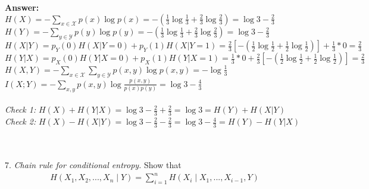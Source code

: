 \documentclass[12pt]{article}
\begin{document}
	\textbf{Answer:} \\
	$H(X) = -\sum_{x\in\mathcal{X}}p(x)\log p(x) = -(\frac{1}{3}\log\frac{1}{3} + \frac{2}{3}\log\frac{2}{3}) = \log3-\frac{2}{3}$\\
	$H(Y) = -\sum_{y\in\mathcal{Y}}p(y)\log p(y) = -(\frac{1}{3}\log\frac{1}{3} + \frac{2}{3}\log\frac{2}{3}) = \log3-\frac{2}{3}$ \\
	$H(X|Y) = p_Y(0)H(X|Y=0)+p_Y(1)H(X|Y=1) = \frac{2}{3}[-(\frac{1}{2}\log\frac{1}{2} + \frac{1}{2}\log\frac{1}{2})] + \frac{1}{3}*0 = \frac{2}{3}$ \\
	$H(Y|X) = p_X(0)H(Y|X=0)+p_X(1)H(Y|X=1) = \frac{1}{3}*0 + \frac{2}{3}[-(\frac{1}{2}\log\frac{1}{2} + \frac{1}{2}\log\frac{1}{2})] = \frac{2}{3}$ \\
	$H(X,Y) = -\sum_{x\in\mathcal{X}}\sum_{y\in\mathcal{Y}}p(x,y)\log p(x,y) = -\log\frac{1}{3}$ \\
	$I(X;Y) = -\sum_{x,y}p(x,y)\log\frac{p(x,y)}{p(x)p(y)} = \log3-\frac{4}{3}$ \\
	\\
	\textit{Check 1:} $H(X)+H(Y|X) = \log3 - \frac{2}{3} + \frac{2}{3} = \log3 = H(Y) + H(X|Y)$ \\
	\textit{Check 2:} $H(X)-H(X|Y) = \log3-\frac{2}{3} - \frac{2}{3} = \log3-\frac{4}{3} = H(Y) - H(Y|X)$ \\
	\\
	\\
	7. \textit{Chain rule for conditional entropy.} Show that 
	\begin{align*}
		H(X_1,X_2,...,X_n\mid Y) = \sum_{i=1}^{n}H(X_i\mid X_1,...,X_{i-1},Y)
	\end{align*}
\end{document}
